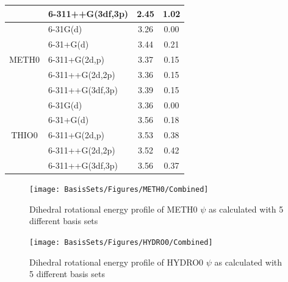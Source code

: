 \documentclass[11pt, oneside, draft]{article}   	%
\begin{document}
\begin{table}[p]
\begin{tabular}{|c|l|c|c|}
                         & 6-311++G(3df,3p) & 2.45          & 1.02                \\ \hline
\multirow{5}{*}{METH0}   & 6-31G(d)         & 3.26          & 0.00                \\ \cline{2-4} 
                         & 6-31+G(d)        & 3.44          & 0.21                \\ \cline{2-4} 
                         & 6-311+G(2d,p)    & 3.37          & 0.15                \\ \cline{2-4} 
                         & 6-311++G(2d,2p)  & 3.36          & 0.15                \\ \cline{2-4} 
                         & 6-311++G(3df,3p) & 3.39          & 0.15                \\ \hline
\multirow{5}{*}{THIO0}   & 6-31G(d)         & 3.36          & 0.00                \\ \cline{2-4} 
                         & 6-31+G(d)        & 3.56          & 0.18                \\ \cline{2-4} 
                         & 6-311+G(2d,p)    & 3.53          & 0.38                \\ \cline{2-4} 
                         & 6-311++G(2d,2p)  & 3.52          & 0.42                \\ \cline{2-4} 
                         & 6-311++G(3df,3p) & 3.56          & 0.37                \\ \hline
\end{tabular}
\end{table}  

\begin{figure}[htb]
\centering
\texttt{[image: BasisSets/Figures/METH0/Combined]}
\caption{Dihedral rotational energy profile of METH0 $\psi$ as calculated with 5 different basis sets}
\label{fig:meth0_basis}
\end{figure}
    
\begin{figure}[htb]
\centering
\texttt{[image: BasisSets/Figures/HYDRO0/Combined]}
\caption{Dihedral rotational energy profile of HYDRO0 $\psi$ as calculated with 5 different basis sets}
\label{fig:hydro0_basis}
\end{figure}
\end{document}
